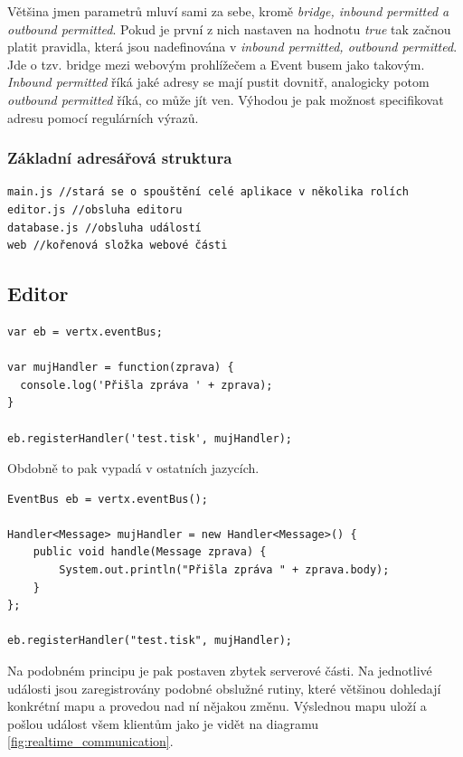 Většina jmen parametrů mluví sami za sebe, kromě \emph{bridge, inbound permitted a outbound permitted}. Pokud je první z nich nastaven na hodnotu \emph{true} tak začnou platit pravidla, která jsou nadefinována v \emph{inbound permitted, outbound permitted}. Jde o tzv. bridge mezi webovým prohlížečem a Event busem jako takovým. \emph{Inbound permitted} říká jaké adresy se mají pustit dovnitř, analogicky potom \emph{outbound permitted} říká, co může jít ven. Výhodou je pak možnost specifikovat adresu pomocí regulárních výrazů.

\subsubsection{Základní adresářová struktura}

\begin{lstlisting}
main.js //stará se o spouštění celé aplikace v několika rolích
editor.js //obsluha editoru
database.js //obsluha událostí 
web //kořenová složka webové části
\end{lstlisting}

\subsection{Editor}

\begin{lstlisting}[caption=Zaregistrování obslužné rutiny v jazyce JavaScript]
var eb = vertx.eventBus;

var mujHandler = function(zprava) {
  console.log('Přišla zpráva ' + zprava);
}

eb.registerHandler('test.tisk', mujHandler);
\end{lstlisting}

Obdobně to pak vypadá v ostatních jazycích. 

\begin{lstlisting}[caption=Zaregistrování obslužné rutiny v jazyce Java]
EventBus eb = vertx.eventBus();

Handler<Message> mujHandler = new Handler<Message>() {
    public void handle(Message zprava) {
        System.out.println("Přišla zpráva " + zprava.body);
    }
};

eb.registerHandler("test.tisk", mujHandler);
\end{lstlisting}

Na podobném principu je pak postaven zbytek serverové části. Na jednotlivé události jsou zaregistrovány podobné obslužné rutiny, které většinou dohledají konkrétní mapu a provedou nad ní nějakou změnu. Výslednou mapu uloží a pošlou událost všem klientům jako je vidět na diagramu \ref{fig:realtime_communication}.

